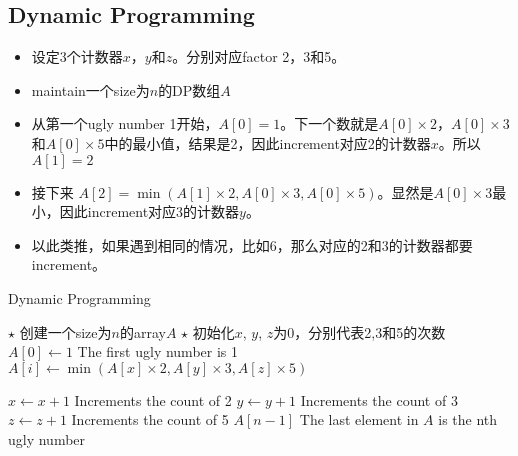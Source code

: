 \subsection{Dynamic Programming}
\begin{itemize}
\item 设定3个计数器$x$，$y$和$z$。分别对应factor 2，3和5。
\item maintain一个size为$n$的DP数组$A$
\item 从第一个ugly number 1开始，$A[0]=1$。下一个数就是$A[0]\times 2$，$A[0]\times 3$和$A[0]\times5$中的最小值，结果是2，因此increment对应2的计数器$x$。所以$A[1]=2$
\item 接下来 $A[2] = \min(A[1]\times2, A[0]\times 3, A[0]\times 5)$。显然是$A[0]\times 3$最小，因此increment对应3的计数器$y$。
\item 以此类推，如果遇到相同的情况，比如6，那么对应的2和3的计数器都要increment。
\end{itemize}
\setcounter{algorithm}{0}
\begin{algorithm}[H]
\caption{Dynamic Programming}
\begin{algorithmic}[1]
\State $\star$ 创建一个size为$n$的array$A$
\State $\star$ 初始化$x$, $y$, $z$为0，分别代表2,3和5的次数
\State $A[0]\gets 1$ \Comment The first ugly number is 1
\State $A[i]\gets \min(A[x]\times 2, A[y]\times 3, A[z]\times 5)$
\EndFor
{}
\end{algorithmic}
\end{algorithm}
\begin{algorithm}[H]
\begin{algorithmic}[1]
\State $x\gets x+1$ \Comment Increments the count of 2
\EndIf
{}
\State $y\gets y+1$ \Comment Increments the count of 3
\EndIf
{}
\State $z\gets z+1$ \Comment Increments the count of 5
\EndIf
\State \Return $A[n-1]$ \Comment The last element in $A$ is the nth ugly number
\EndProcedure
\end{algorithmic}
\end{algorithm}